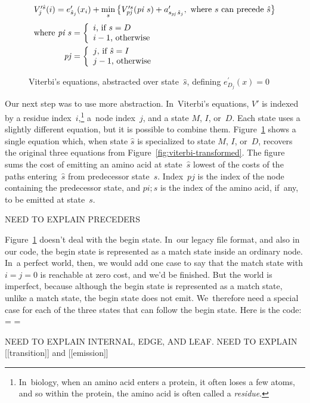 \documentclass[]{jfp1}
\newcommand\figref[1]{Figure~\ref{fig:#1}}
\newcommand\figlabel[1]{\label{fig:#1}}
\newif\ifverbatimsmall
\newcommand\smallverbatiminput[1]{%
  \verbatimsmalltrue
  \presvtopsep=\topsep
  \topsep=0.78\topsep
  \verbatimsmallfalse
  \topsep=\presvtopsep
}
\begin{document}
\def\p#1{\mathit{p#1}}
\begin{figure}
\def\vsum#1#2{#1+#2}
\[
\begin{array}{r@{}c@{}l}
\multicolumn3{c}{
  V_{j}^{\prime \hat s}(i) = e^{\prime}_{\hat s_{j}}(x_{i}) 
    + \min\limits_s \big\{
         \vsum{V_{\mathit{\p j}}^{\prime s}(\p i\; s)} 
     {a^{\prime}_{s_{\p j} \,\hat s_j}}, 
      \mbox{ where $s$ can precede $\hat s$}  \big\}
}
\\[10pt]
\mbox{where }\p i\; s&{} = {}& 
  \left\{ \begin{array}{l}
          i \mbox{, if $s=D$}\\
          i-1 \mbox{, otherwise}\\
          \end{array}
  \right.
\\[10pt]
\p j &{} = {}& 
  \left\{ \begin{array}{l}
          j \mbox{, if $\hat s=I$}\\
          j-1 \mbox{, otherwise}\\
          \end{array}
  \right.
\\
\end{array}
\]

\caption{Viterbi's equations, abstracted over state~$\hat s$, 
defining $e^{\prime}_{D_j}(x) = 0$}
\figlabel{viterbi-abstracted}
\end{figure}


Our next step was to use more abstraction.
In~Viterbi's equations,
$V'$ is indexed by a residue index~$i$,\footnote
{In~biology, when an amino acid enters a protein, it often loses a few
atoms, and so within the protein, the amino acid is often called
a \emph{residue}.}
 a~node index~$j$,
and
a state $M$, $I$, or~$D$.
Each state uses a slightly different equation, but it is possible to
combine them.
\figref{viterbi-abstracted} shows a single equation which, when
state $\hat s$ is specialized to state $M$, $I$, or~$D$, recovers the
original three equations from \figref{viterbi-transformed}.
The figure sums the cost of emitting an amino acid at state~$\hat s$
lowest of the costs of the paths entering~$\hat s$ from predecessor
state~$s$.
Index~$\p j$ is the index of the node containing the predecessor
state, and $\p i; s$ is the index of the amino acid, if~any, to be
emitted at state~$s$.

NEED TO EXPLAIN PRECEDERS


\figref{viterbi-abstracted} doesn't deal with the begin state.
In~our legacy file format, and also in our code, the begin state is
represented as a match state inside an ordinary node.
In~a perfect world, then, we would add one case to say that the match
state with $i=j=0$ is reachable at zero cost, and we'd be finished.
But the world is imperfect, because although the begin state is
represented as a match state, unlike a match state, the begin state
does not emit.
We~therefore need a special case for each of the three states that can
follow the begin state.
Here is the code:
\smallverbatiminput{hov4}
NEED TO EXPLAIN INTERNAL, EDGE, AND LEAF.
NEED TO EXPLAIN [[transition]] and [[emission]]
\end{document}
